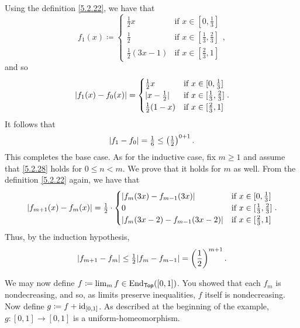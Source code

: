 \begin{exm}
Using the definition \eqref{5.2.22}, we have that
\begin{equation}
f_1(x)\coloneqq \begin{cases}\tfrac{1}{2}x & \text{if }x\in [0,\tfrac{1}{3}] \\ \tfrac{1}{2} & \text{if }x\in [\tfrac{1}{3},\tfrac{2}{3}] \\ \tfrac{1}{2}(3x-1) & \text{if }x\in [\tfrac{2}{3},1]\end{cases},
\end{equation}
and so
\begin{equation}
\left| f_1(x)-f_0(x)\right| =\begin{cases}\tfrac{1}{2}x & \text{if }x\in [0,\tfrac{1}{3}] \\ \lvert x-\tfrac{1}{2}\rvert & \text{if }x\in [\tfrac{1}{3},\tfrac{2}{3}] \\ \tfrac{1}{2}(1-x) & \text{if }x\in [\tfrac{2}{3},1]\end{cases}.
\end{equation}
It follows that
\begin{equation}
\norm[f_1-f_0]=\tfrac{1}{6}\leq \left( \tfrac{1}{2}\right) ^{0+1}.
\end{equation}
This completes the base case.  As for the inductive case, fix $m\geq 1$ and assume that \eqref{5.2.28} holds for $0\leq n<m$.  We prove that it holds for $m$ as well.  From the definition \eqref{5.2.22} again, we have that
\begin{equation}
\lvert f_{m+1}(x)-f_m(x)\rvert=\tfrac{1}{2}\cdot \begin{cases}\lvert f_m(3x)-f_{m-1}(3x)\rvert & \text{if }x\in [0,\tfrac{1}{3}] \\ 0 & \text{if }x\in [\tfrac{1}{3},\tfrac{2}{3}] \\ \lvert f_m(3x-2)-f_{m-1}(3x-2)\rvert & \text{if }x\in [\tfrac{2}{3},1]\end{cases}.
\end{equation}
Thus, by the induction hypothesis,
\begin{equation}
\norm[f_{m+1}-f_m]\leq \tfrac{1}{2}\norm[f_m-f_{m-1}]=\left( \frac{1}{2}\right) ^{m+1}.
\end{equation}

We may now define $f\coloneqq \lim _mf\in \operatorname{End} _{\mathsf{Top}}([0,1])$.  You showed that each $f_m$ is nondecreasing, and so, as limits preserve inequalities, $f$ itself is nondecreasing.  Now define $g\coloneqq f+\operatorname{id} _{[0,1]}$.  As described at the beginning of the example, $g:[0,1]\rightarrow [0,1]$ is a uniform-homeomorphism.


\end{exm}
